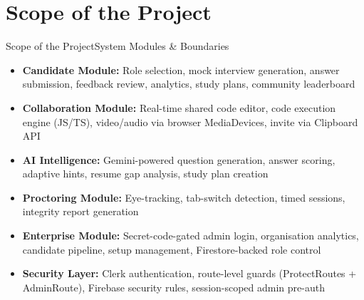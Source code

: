 \documentclass{beamer}
\begin{document}
\section{Scope of the Project}
\begin{frame}{Scope of the Project}{System Modules \& Boundaries}
\begin{itemize}
    \item \textbf{Candidate Module:} Role selection, mock interview generation, answer submission, feedback review, analytics, study plans, community leaderboard

    \item \textbf{Collaboration Module:} Real-time shared code editor, code execution engine (JS/TS), video/audio via browser MediaDevices, invite via Clipboard API

    \item \textbf{AI Intelligence:} Gemini-powered question generation, answer scoring, adaptive hints, resume gap analysis, study plan creation

    \item \textbf{Proctoring Module:} Eye-tracking, tab-switch detection, timed sessions, integrity report generation

    \item \textbf{Enterprise Module:} Secret-code-gated admin login, organisation analytics, candidate pipeline, setup management, Firestore-backed role control

    \item \textbf{Security Layer:} Clerk authentication, route-level guards (ProtectRoutes + AdminRoute), Firebase security rules, session-scoped admin pre-auth
\end{itemize}
\end{frame}

\end{document}
